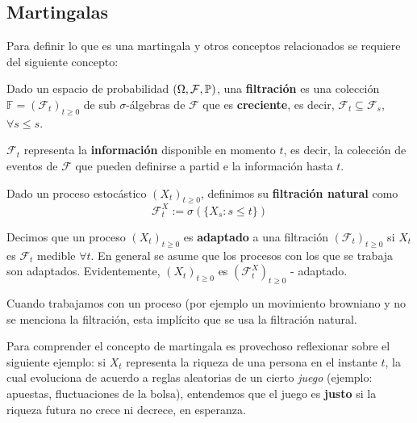 \subsection{Martingalas}

Para definir lo que es una martingala y otros conceptos relacionados se requiere del siguiente concepto:

\begin{definition}[Filtración]
        Dado un espacio de probabilidad $(\Omega, \mathcal{F}, \P)$, una \textbf{filtración} es una 
        colección $\mathbb{F} = (\mathcal{F}_{t})_{t \geq 0}$ de sub $\sigma$-álgebras de $\mathcal{F}$ 
        que es \textbf{creciente}, es decir, $\mathcal{F}_t \subseteq \mathcal{F}_s$, $\forall s \leq s$.
\end{definition}

$\mathcal{F}_t$ representa la \textbf{información} disponible en momento $t$, es decir, la colección 
de eventos de $\mathcal{F}$ que pueden definirse a partid e la información hasta $t$. 

\newp Dado un proceso estocástico $(X_t)_{t \geq 0}$, definimos su \textbf{filtración natural} como 
\begin{equation*}
        \mathcal{F}^{X}_t := \sigma\left( \{ X_s : s \leq t \}\right) 
\end{equation*}

\newp Decimos que un proceso $(X_{t})_{t \geq 0}$ es \textbf{adaptado} a una filtración $(\mathcal{F}_t)_{t \geq 0}$ 
si $X_t$ es $\mathcal{F}_t$ medible $\forall t$. En general se asume que los
procesos con los que se trabaja son adaptados. Evidentemente, $(X_t)_{t \geq 0}$ es $(\mathcal{F}^X_t)_{t \geq 0}$ - adaptado.

\newp Cuando trabajamos con un proceso (por ejemplo un movimiento browniano y no se
menciona la filtración, esta implícito que se usa la filtración natural. 

\newp Para comprender el concepto de martingala es provechoso reflexionar sobre el siguiente ejemplo: si 
$X_t$ representa la riqueza de una persona en el instante $t$, la cual evoluciona de acuerdo a 
reglas aleatorias de un cierto \textit{juego} (ejemplo: apuestas, fluctuaciones de la bolsa), 
entendemos que el juego es \textbf{justo} si la riqueza futura no crece ni decrece, en esperanza.

